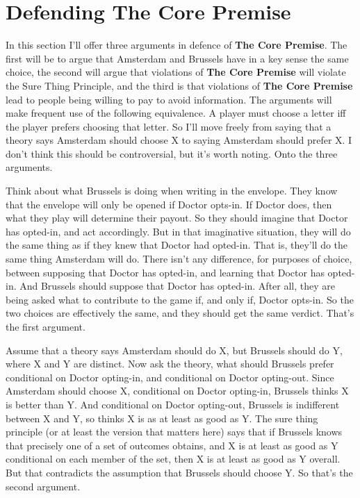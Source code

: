 \documentclass[
  12pt,
]{article}
\begin{document}
\hypertarget{defending-the-core-premise}{%
\section{Defending The Core Premise}\label{defending-the-core-premise}}

In this section I'll offer three arguments in defence of \textbf{The
Core Premise}. The first will be to argue that Amsterdam and Brussels
have in a key sense the same choice, the second will argue that
violations of \textbf{The Core Premise} will violate the Sure Thing
Principle, and the third is that violations of \textbf{The Core Premise}
lead to people being willing to pay to avoid information. The arguments
will make frequent use of the following equivalence. A player must
choose a letter iff the player prefers choosing that letter. So I'll
move freely from saying that a theory says Amsterdam should choose X to
saying Amsterdam should prefer X. I don't think this should be
controversial, but it's worth noting. Onto the three arguments.

Think about what Brussels is doing when writing in the envelope. They
know that the envelope will only be opened if Doctor opts-in. If Doctor
does, then what they play will determine their payout. So they should
imagine that Doctor has opted-in, and act accordingly. But in that
imaginative situation, they will do the same thing as if they knew that
Doctor had opted-in. That is, they'll do the same thing Amsterdam will
do. There isn't any difference, for purposes of choice, between
supposing that Doctor has opted-in, and learning that Doctor has
opted-in. And Brussels should suppose that Doctor has opted-in. After
all, they are being asked what to contribute to the game if, and only
if, Doctor opts-in. So the two choices are effectively the same, and
they should get the same verdict. That's the first argument.

Assume that a theory says Amsterdam should do X, but Brussels should do
Y, where X and Y are distinct. Now ask the theory, what should Brussels
prefer conditional on Doctor opting-in, and conditional on Doctor
opting-out. Since Amsterdam should choose X, conditional on Doctor
opting-in, Brussels thinks X is better than Y. And conditional on Doctor
opting-out, Brussels is indifferent between X and Y, so thinks X is as
at least as good as Y. The sure thing principle (or at least the version
that matters here) says that if Brussels knows that precisely one of a
set of outcomes obtains, and X is at least as good as Y conditional on
each member of the set, then X is at least as good as Y overall. But
that contradicts the assumption that Brussels should choose Y. So that's
the second argument.
\end{document}
